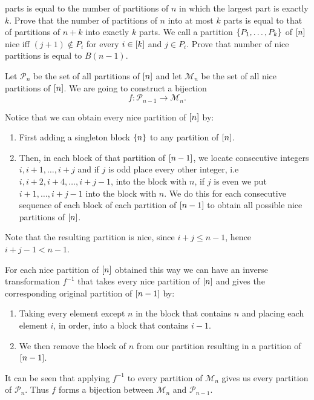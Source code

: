 \begin{chapterendexercises}
    parts is equal to the number of partitions of $n$ in which the
    largest part is exactly $k$.
  \exercise[recommended] Prove that the number of partitions of $n$ into at most
    $k$ parts is equal to that of partitions of $n + k$ into exactly $k$ parts.
  \exercise[recommended] We call a partition $\set{P_1, \dots, P_k}$ of
    ${[{n}]}$ nice iff $(j + 1) \not\in P_i$ for every $i \in {[{k}]}$ and
    $j \in P_i$.
    Prove that number of nice partitions is equal to $B(n - 1)$.
    \begin{solution}
      Let $\mathcal{P}_n$ be the set of all partitions of ${[{n}]}$ and let
      $\mathcal{M}_n$ be the set of all nice partitions of ${[{n}]}$. We are
      going to construct a bijection
      \[
        f : \mathcal{P}_{n - 1} \to \mathcal{M}_n.
      \]

      Notice that we can obtain every nice partition of ${[{n}]}$ by:
      \begin{enumerate}
        \item First adding a singleton block $\set{n}$ to any partition of
          ${[{n}]}$.
        \item Then, in each block of that partition of ${[{n - 1}]}$, we locate
          consecutive integers $i, i + 1, \dots, i + j$ and if $j$ is odd place
          every other integer, i.e $i, i + 2, i + 4, \dots, i + j - 1$, into
          the block with $n$, if $j$ is even we put $i + 1, \dots, i + j - 1$ into
          the block with $n$. We do this for each consecutive sequence of each
          block of each partition of ${[{n - 1}]}$ to obtain all possible nice
          partitions of ${[{n}]}$.
      \end{enumerate}
      Note that the resulting partition is nice, since $i + j \le n - 1$, hence
      $i + j - 1 < n - 1$.

      For each nice partition of ${[{n}]}$ obtained this way we can have an
      inverse transformation $f^{-1}$ that takes every nice partition of
      ${[{n}]}$ and gives the corresponding original partition of 
      ${[{n - 1}]}$ by:
      \begin{enumerate}
        \item Taking every element except $n$ in the block that contains
          $n$ and placing each element $i$, in order, into a block that contains
          $i - 1$.
        \item We then remove the block of $n$ from our partition resulting in a
          partition of ${[{n - 1}]}$.
      \end{enumerate}

      It can be seen that applying $f^{-1}$ to every partition of $\mathcal{M}_n$ gives us
      every partition of $\mathcal{P}_n$. Thus $f$ forms a bijection between
      $\mathcal{M}_n$ and $\mathcal{P}_{n - 1}$.
    \end{solution}
\end{chapterendexercises}
